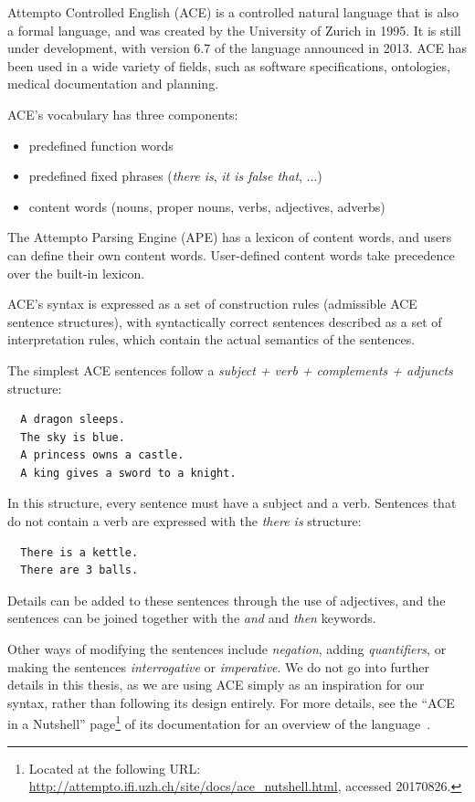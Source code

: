 \documentclass[11pt]{report}
\begin{document}
Attempto Controlled English (ACE) is a controlled natural language that is also
a formal language, and was created by the University of Zurich in 1995. It is
still under development, with version 6.7 of the language announced in 2013. ACE
has been used in a wide variety of fields, such as software specifications,
ontologies, medical documentation and planning.

ACE's vocabulary has three components:

\begin{itemize}
  \item predefined function words
  \item predefined fixed phrases (\emph{there is}, \emph{it is false that}, ...)
  \item content words (nouns, proper nouns, verbs, adjectives, adverbs)
\end{itemize}

The Attempto Parsing Engine (APE) has a lexicon of content words, and users can
define their own content words. User-defined content words take precedence over
the built-in lexicon.

ACE's syntax is expressed as a set of construction rules (admissible ACE
sentence structures), with syntactically
correct sentences described as a set of interpretation rules, which contain the
actual semantics of the sentences.

The simplest ACE sentences follow a \emph{subject + verb + complements +
  adjuncts} structure:

\begin{lstlisting}
  A dragon sleeps.
  The sky is blue.
  A princess owns a castle.
  A king gives a sword to a knight.
\end{lstlisting}

In this structure, every sentence must have a subject and a verb. Sentences that
do not contain a verb are expressed with the \emph{there is} structure:

\begin{lstlisting}
  There is a kettle.
  There are 3 balls.
\end{lstlisting}

Details can be added to these sentences through the use of adjectives, and the
sentences can be joined together with the \emph{and} and \emph{then} keywords.

Other ways of modifying the sentences include \emph{negation}, adding
\emph{quantifiers}, or making the sentences \emph{interrogative} or
\emph{imperative}. We do not go into further details in this thesis, as we are
using ACE simply as an inspiration for our syntax, rather than following its
design entirely. For more details, see the ``ACE in a Nutshell''
page\footnote{Located at the following URL:
  \url{http://attempto.ifi.uzh.ch/site/docs/ace_nutshell.html}, accessed 20170826.} of its
documentation for an overview of the language~\citep{ace-nutshell}.
\end{document}
